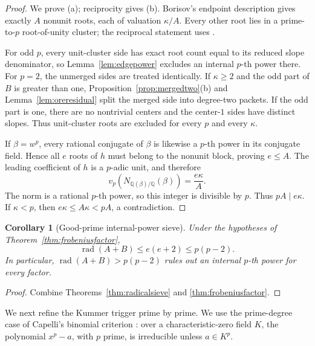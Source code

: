 \documentclass[11pt]{article}
\numberwithin{equation}{section}
\newtheorem{corollary}[theorem]{Corollary}
\theoremstyle{definition}
\newcommand{\Q}{\mathbb Q}
\begin{document}
\begin{proof}
We prove (a); reciprocity gives (b).  Borisov's endpoint description
\cite[Lemma~2.10]{Borisov1998} gives exactly \(A\) nonunit roots, each of
valuation \(\kappa/A\).  Every other root lies in a prime-to-\(p\)
root-of-unity cluster; the reciprocal statement uses
\cite[Lemma~2.11]{Borisov1998}.

For odd \(p\), every unit-cluster side has exact root count equal to its
reduced slope denominator, so Lemma~\ref{lem:edgepower} excludes an internal
\(p\)-th power there.  For \(p=2\), the unmerged sides are treated
identically.  If \(\kappa\geq2\) and the odd part of \(B\) is greater than
one, Proposition~\ref{prop:mergedtwo}(b) and
Lemma~\ref{lem:oreresidual} split the merged side into degree-two packets.
If the odd part is one, there are no nontrivial centers and the center-\(1\)
sides have distinct slopes.  Thus unit-cluster roots are excluded for every
\(p\) and every \(\kappa\).

If \(\beta=w^p\), every rational conjugate of \(\beta\) is likewise a
\(p\)-th power in its conjugate field.  Hence all \(e\) roots of \(h\) must
belong to the nonunit block, proving \(e\leq A\).  The leading coefficient
of \(h\) is a \(p\)-adic unit, and therefore
\[
 v_p\!\left(N_{\Q(\beta)/\Q}(\beta)\right)
 =\frac{e\kappa}{A}.
\]
The norm is a rational \(p\)-th power, so this integer is divisible by
\(p\).  Thus \(pA\mid e\kappa\).  If \(\kappa<p\), then
\(e\kappa\leq A\kappa<pA\), a contradiction.
\end{proof}

\begin{corollary}[Good-prime internal-power sieve]
\label{cor:goodpower}
Under the hypotheses of Theorem~\ref{thm:frobeniusfactor},
\[
 \operatorname{rad}(A+B)\leq e(e+2)\leq p(p-2).
\]
In particular, \(\operatorname{rad}(A+B)>p(p-2)\) rules out an internal
\(p\)-th power for every factor.
\end{corollary}

\begin{proof}
Combine Theorems~\ref{thm:radicalsieve} and
\ref{thm:frobeniusfactor}.
\end{proof}

We next refine the Kummer trigger prime by prime.  We use the prime-degree
case of Capelli's binomial criterion
\cite[Chapter~VI, Section~9]{LangAlgebra}: over a characteristic-zero field
\(K\), the polynomial \(x^p-a\), with \(p\) prime, is irreducible unless
\(a\in K^p\).
\end{document}
